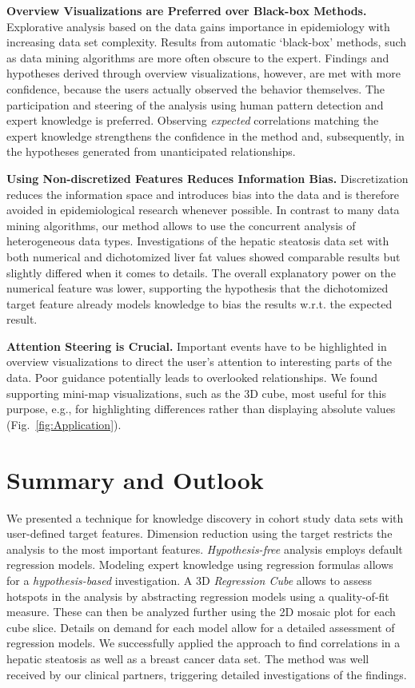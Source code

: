 \documentclass[journal]{style/vgtc} 			          %
\begin{document}
\textbf{Overview Visualizations are Preferred over Black-box Methods.}
Explorative analysis based on the data gains importance in epidemiology with increasing data set complexity.
Results from automatic `black-box' methods, such as data mining algorithms are more often obscure to the expert.
Findings and hypotheses derived through overview visualizations, however, are met with more confidence, because the users actually observed the behavior themselves.
The participation and steering of the analysis using human pattern detection and expert knowledge is preferred.
Observing \emph{expected} correlations matching the expert knowledge strengthens the confidence in the method and, subsequently, in the hypotheses generated from unanticipated relationships.

\textbf{Using Non-discretized Features Reduces Information Bias.}
Discretization reduces the information space and introduces bias into the data and is therefore avoided in epidemiological research whenever possible.
In contrast to many data mining algorithms, our method allows to use the concurrent analysis of heterogeneous data types.
Investigations of the hepatic steatosis data set with both numerical and dichotomized liver fat values showed comparable results but slightly differed when it comes to details.
The overall explanatory power on the numerical feature was lower, supporting the hypothesis that the dichotomized target feature already models knowledge to bias the results w.r.t. the expected result.

\textbf{Attention Steering is Crucial.}
Important events have to be highlighted in overview visualizations to direct the user's attention to interesting parts of the data.
Poor guidance potentially leads to overlooked relationships.
We found supporting mini-map visualizations, such as the 3D cube, most useful for this purpose, e.g., for highlighting differences rather than displaying absolute values (Fig.~\ref{fig:Application}).
\section{Summary and Outlook}
We presented a technique for knowledge discovery in cohort study data sets with user-defined target features.
Dimension reduction using the target restricts the analysis to the most important features.
\emph{Hypothesis-free} analysis employs default regression models.
Modeling expert knowledge using regression formulas allows for a \emph{hypothesis-based} investigation.
A 3D \emph{Regression Cube} allows to assess hotspots in the analysis by abstracting regression models using a quality-of-fit measure.
These can then be analyzed further using the 2D mosaic plot for each cube slice.
Details on demand for each model allow for a detailed assessment of regression models.
We successfully applied the approach to find correlations in a hepatic steatosis as well as a breast cancer data set.
The method was well received by our clinical partners, triggering detailed investigations of the findings.
\end{document}
